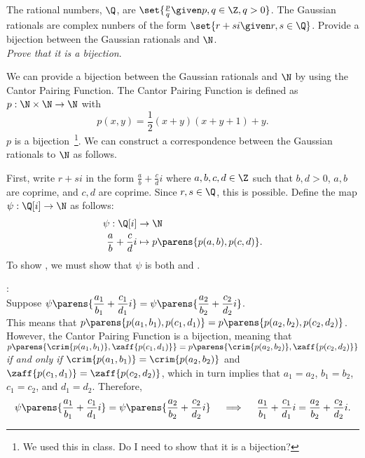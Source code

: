 \begin{problem}
  The rational numbers, $\Q$, are
  $\set{\frac{p}{q} \given p, q \in \Z, q > 0}$.
  The Gaussian rationals are complex nunbers of the form
  $\set{ r + si \given r, s \in \Q}$.
  Provide a bijection between the Gaussian rationals
  and $\N$. \\
  \emph{Prove that it is a bijection}.

  \begin{answer}
    We can provide a bijection between the Gaussian rationals
    and $\N$ by using the Cantor Pairing Function.
    The Cantor Pairing Function is defined as $p: \N \times \N \to \N$ with
    \[
      p(x, y) = \frac{1}{2}(x + y)(x + y + 1) + y.
    \]
    $p$ is a bijection~\footnote{We used this in class. Do I need to show that it is a bijection?}.
    We can construct a correspondence between the Gaussian rationals
    to $\N$ as follows.

    First, write $r + si$ in the form $\displaystyle \frac{a}{b} + \frac{c}{d}i$
    where $a, b, c, d \in \Z$ such that $b, d > 0$,
    $a, b$ are coprime, and $c, d$ are coprime.
    Since $r, s \in \Q$, this is possible. Define the map $\psi: \Q[i] \to \N$ as follows:
    \begin{align*}
      \psi: \Q[i] &\to \N \\
      \frac{a}{b} + \frac{c}{d}i &\mapsto p\parens{p(a, b), p(c, d)}.
    \end{align*}
        To show , we must show that $\psi$ is
        both  and .
  
        \begin{enumarabic}
          \item {}: \\
            Suppose $\displaystyle \psi\parens{\frac{a_1}{b_1} + \frac{c_1}{d_1}i}
            = \psi\parens{\frac{a_2}{b_2} + \frac{c_2}{d_2}i}$. \\
            This means that $p\parens{p(a_1, b_1), p(c_1, d_1)} = p\parens{p(a_2, b_2), p(c_2, d_2)}$.
            However, the Cantor Pairing Function is a bijection,
            meaning that $p\parens{ \crim{p(a_1, b_1)}, \zaff{p(c_1, d_1)}} = p\parens{\crim{p(a_2, b_2)}, \zaff{p(c_2, d_2)}}$
            \emph{if and only if} $\crim{p(a_1, b_1)} = \crim{p(a_2, b_2)}$ and $\zaff{p(c_1, d_1)} = \zaff{p(c_2, d_2)}$,
            which in turn implies that $a_1 = a_2$, $b_1 = b_2$, $c_1 = c_2$, and $d_1 = d_2$.
            Therefore,
            \[ 
                \psi\parens{\frac{a_1}{b_1} + \frac{c_1}{d_1}i}
                  = \psi\parens{\frac{a_2}{b_2} + \frac{c_2}{d_2}i}
                  \quad \implies \quad
                  \frac{a_1}{b_1} + \frac{c_1}{d_1}i = \frac{a_2}{b_2} + \frac{c_2}{d_2}i.
            \]
  

\end{enumarabic}
\end{answer}
\end{problem}
